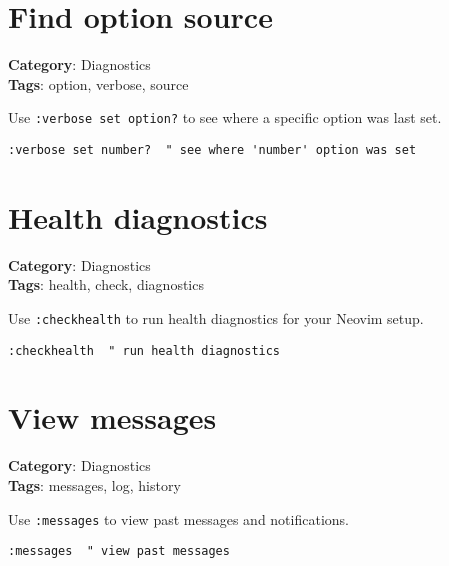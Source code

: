{{{\section{Find option source}

\textbf{Category}: Diagnostics\\ \textbf{Tags}: option, verbose, source
\vspace{0.5cm}

Use {\footnotesize \Verb§:verbose set option?§} to see where a specific option was last set.

\begin{Exa*}{}
\begin{Verbatim}[fontsize=\footnotesize, breaklines, breakanywhere]
:verbose set number?  " see where 'number' option was set
\end{Verbatim}
\end{Exa*}

\section{Health diagnostics}

\textbf{Category}: Diagnostics\\ \textbf{Tags}: health, check, diagnostics
\vspace{0.5cm}

Use {\footnotesize \Verb§:checkhealth§} to run health diagnostics for your Neovim setup.

\begin{Exa*}{}
\begin{Verbatim}[fontsize=\footnotesize, breaklines, breakanywhere]
:checkhealth  " run health diagnostics
\end{Verbatim}
\end{Exa*}

\section{View messages}

\textbf{Category}: Diagnostics\\ \textbf{Tags}: messages, log, history
\vspace{0.5cm}

Use {\footnotesize \Verb§:messages§} to view past messages and notifications.

\begin{Exa*}{}
\begin{Verbatim}[fontsize=\footnotesize, breaklines, breakanywhere]
:messages  " view past messages
\end{Verbatim}
\end{Exa*}

}}}
